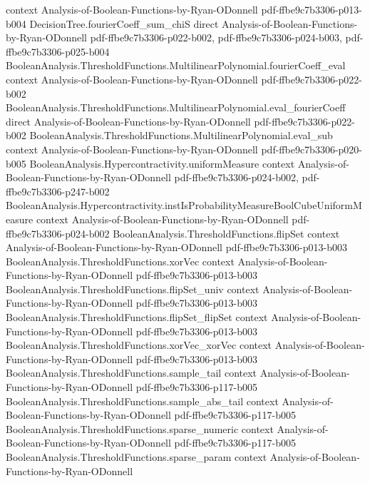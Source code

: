 \begin{theorem}
  {context}
  {Analysis-of-Boolean-Functions-by-Ryan-ODonnell}
  {pdf-ffbe9c7b3306-p013-b004}
\proofstep
  {DecisionTree.fourierCoeff_sum_chiS}
  {direct}
  {Analysis-of-Boolean-Functions-by-Ryan-ODonnell}
  {pdf-ffbe9c7b3306-p022-b002,
    pdf-ffbe9c7b3306-p024-b003,
    pdf-ffbe9c7b3306-p025-b004}
\proofstep
  {BooleanAnalysis.ThresholdFunctions.MultilinearPolynomial.fourierCoeff_eval}
  {context}
  {Analysis-of-Boolean-Functions-by-Ryan-ODonnell}
  {pdf-ffbe9c7b3306-p022-b002}
\proofstep
  {BooleanAnalysis.ThresholdFunctions.MultilinearPolynomial.eval_fourierCoeff}
  {direct}
  {Analysis-of-Boolean-Functions-by-Ryan-ODonnell}
  {pdf-ffbe9c7b3306-p022-b002}
\proofstep
  {BooleanAnalysis.ThresholdFunctions.MultilinearPolynomial.eval_sub}
  {context}
  {Analysis-of-Boolean-Functions-by-Ryan-ODonnell}
  {pdf-ffbe9c7b3306-p020-b005}
\proofstep
  {BooleanAnalysis.Hypercontractivity.uniformMeasure}
  {context}
  {Analysis-of-Boolean-Functions-by-Ryan-ODonnell}
  {pdf-ffbe9c7b3306-p024-b002,
    pdf-ffbe9c7b3306-p247-b002}
\proofstep
  {BooleanAnalysis.Hypercontractivity.instIsProbabilityMeasureBoolCubeUniformMeasure}
  {context}
  {Analysis-of-Boolean-Functions-by-Ryan-ODonnell}
  {pdf-ffbe9c7b3306-p024-b002}
\proofstep
  {BooleanAnalysis.ThresholdFunctions.flipSet}
  {context}
  {Analysis-of-Boolean-Functions-by-Ryan-ODonnell}
  {pdf-ffbe9c7b3306-p013-b003}
\proofstep
  {BooleanAnalysis.ThresholdFunctions.xorVec}
  {context}
  {Analysis-of-Boolean-Functions-by-Ryan-ODonnell}
  {pdf-ffbe9c7b3306-p013-b003}
\proofstep
  {BooleanAnalysis.ThresholdFunctions.flipSet_univ}
  {context}
  {Analysis-of-Boolean-Functions-by-Ryan-ODonnell}
  {pdf-ffbe9c7b3306-p013-b003}
\proofstep
  {BooleanAnalysis.ThresholdFunctions.flipSet_flipSet}
  {context}
  {Analysis-of-Boolean-Functions-by-Ryan-ODonnell}
  {pdf-ffbe9c7b3306-p013-b003}
\proofstep
  {BooleanAnalysis.ThresholdFunctions.xorVec_xorVec}
  {context}
  {Analysis-of-Boolean-Functions-by-Ryan-ODonnell}
  {pdf-ffbe9c7b3306-p013-b003}
\proofstep
  {BooleanAnalysis.ThresholdFunctions.sample_tail}
  {context}
  {Analysis-of-Boolean-Functions-by-Ryan-ODonnell}
  {pdf-ffbe9c7b3306-p117-b005}
\proofstep
  {BooleanAnalysis.ThresholdFunctions.sample_abs_tail}
  {context}
  {Analysis-of-Boolean-Functions-by-Ryan-ODonnell}
  {pdf-ffbe9c7b3306-p117-b005}
\proofstep
  {BooleanAnalysis.ThresholdFunctions.sparse_numeric}
  {context}
  {Analysis-of-Boolean-Functions-by-Ryan-ODonnell}
  {pdf-ffbe9c7b3306-p117-b005}
\proofstep
  {BooleanAnalysis.ThresholdFunctions.sparse_param}
  {context}
  {Analysis-of-Boolean-Functions-by-Ryan-ODonnell}

\end{theorem}
